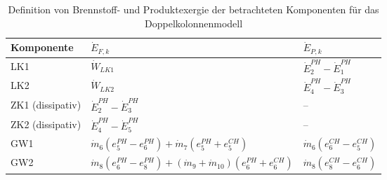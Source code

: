 \begin{landscape}

\begin{table}[p]
\centering
\caption{Definition von Brennstoff- und Produktexergie der betrachteten Komponenten für das Doppelkolonnenmodell}
\label{tab:exdef_components_doppel}
\vspace{0.2em}
\begin{tabular}{lll}
\toprule
Komponente & $\dot{E}_{F,k}$ & $\dot{E}_{P,k}$ \\
\midrule
LK1 &
$\dot{W}_{LK1}$ &
$\dot{E}^{PH}_{2}-\dot{E}^{PH}_{1}$ \\

LK2 &
$\dot{W}_{LK2}$ &
$\dot{E}^{PH}_{4}-\dot{E}^{PH}_{3}$ \\

ZK1 (dissipativ) &
$\dot{E}^{PH}_{2}-\dot{E}^{PH}_{3}$ &
-- \\

ZK2 (dissipativ) &
$\dot{E}^{PH}_{4}-\dot{E}^{PH}_{5}$ &
-- \\
\addlinespace
GW1 & 
$\dot{m}_{6}(e^{PH}_{5} - e^{PH}_{6}) + \dot{m}_{7}(e^{PH}_{5} + e^{CH}_{5})$ & 
$\dot{m}_{6}(e^{CH}_{6} - e^{CH}_{5})$ \\
\addlinespace
GW2 & 
$\dot{m}_{8}(e^{PH}_{6} - e^{PH}_{8}) + (\dot{m}_{9} + \dot{m}_{10})(e^{PH}_{6} + e^{CH}_{6})$ & 
$\dot{m}_{8}(e^{CH}_{8} - e^{CH}_{6})$ \\


\end{tabular}
\end{table}
\end{landscape}
